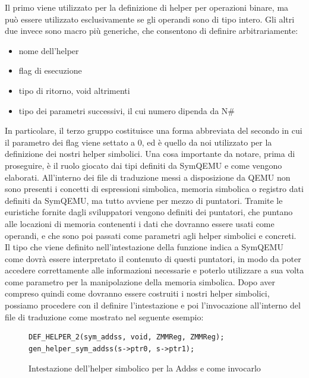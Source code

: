\documentclass[Lau, oneside]{sapthesis}%
\begin{document}
Il primo viene utilizzato per la definizione di helper per operazioni binare, ma può essere utilizzato esclusivamente se gli operandi sono di tipo intero.
\newline
Gli altri due invece sono macro più generiche, che consentono di definire arbitrariamente:
\begin{itemize}
    \item nome dell'helper
    \item flag di esecuzione
    \item tipo di ritorno, void altrimenti
    \item tipo dei parametri successivi, il cui numero dipenda da N\#
\end{itemize}
In particolare, il terzo gruppo costituisce una forma abbreviata del secondo in cui il parametro dei flag viene settato a 0, ed è quello da noi utilizzato per la definizione dei nostri helper simbolici.
\newline \newline
Una cosa importante da notare, prima di proseguire, è il ruolo giocato dai tipi definiti da SymQEMU e come vengono elaborati.
\newline \newline
All'interno dei file di traduzione messi a disposizione da QEMU non sono presenti i concetti di espressioni simbolica, memoria simbolica o registro dati definiti da SymQEMU, ma tutto avviene per mezzo di puntatori.
\newline
Tramite le euristiche fornite dagli sviluppatori vengono definiti dei puntatori, che puntano alle locazioni di memoria contenenti i dati che dovranno essere usati come operandi, e che sono poi passati come parametri agli helper simbolici e concreti.
\newline
Il tipo che viene definito nell'intestazione della funzione indica a SymQEMU come dovrà essere interpretato il contenuto di questi puntatori, in modo da poter accedere correttamente alle informazioni necessarie e poterlo utilizzare a sua volta come parametro per la manipolazione della memoria simbolica.
\newline \newline
Dopo aver compreso quindi come dovranno essere costruiti i nostri helper simbolici, possiamo procedere con il definire l'intestazione e poi l'invocazione all'interno del file di traduzione come mostrato nel seguente esempio:
\begin{figure}[h]
\begin{lstlisting}[xleftmargin=.112\textwidth]
DEF_HELPER_2(sym_addss, void, ZMMReg, ZMMReg);
gen_helper_sym_addss(s->ptr0, s->ptr1);
\end{lstlisting}
    \caption{Intestazione dell’helper simbolico per la Addss e come invocarlo}
    \label{fig:intestazione_addss}
\end{figure}
\end{document}
